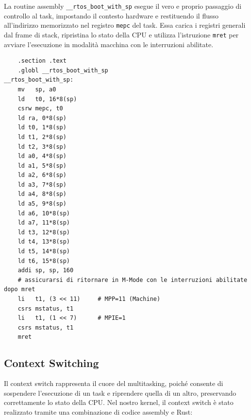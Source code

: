 \documentclass[italian, Lau, oneside]{sapthesis} %
\begin{document}
La routine assembly \texttt{\_\_rtos\_boot\_with\_sp} esegue il vero e proprio passaggio di controllo al task, impostando il contesto hardware e restituendo il flusso all’indirizzo memorizzato nel registro \texttt{mepc} del task.  
Essa carica i registri generali dal frame di stack, ripristina lo stato della CPU e utilizza l’istruzione \texttt{mret} per avviare l’esecuzione in modalità macchina con le interruzioni abilitate.

\begin{center}
\begin{verbatim}
    .section .text
    .globl __rtos_boot_with_sp
__rtos_boot_with_sp:
    mv   sp, a0
    ld   t0, 16*8(sp)
    csrw mepc, t0
    ld ra, 0*8(sp)
    ld t0, 1*8(sp)
    ld t1, 2*8(sp)
    ld t2, 3*8(sp)
    ld a0, 4*8(sp)
    ld a1, 5*8(sp)
    ld a2, 6*8(sp)
    ld a3, 7*8(sp)
    ld a4, 8*8(sp)
    ld a5, 9*8(sp)
    ld a6, 10*8(sp)
    ld a7, 11*8(sp)
    ld t3, 12*8(sp)
    ld t4, 13*8(sp)
    ld t5, 14*8(sp)
    ld t6, 15*8(sp)
    addi sp, sp, 160
    # assicurarsi di ritornare in M-Mode con le interruzioni abilitate dopo mret
    li   t1, (3 << 11)     # MPP=11 (Machine)
    csrs mstatus, t1
    li   t1, (1 << 7)      # MPIE=1
    csrs mstatus, t1
    mret
\end{verbatim}
\end{center}



\subsection{Context Switching}
Il context switch rappresenta il cuore del multitasking, poiché consente di sospendere l’esecuzione di un task e riprendere quella di un altro, preservando correttamente lo stato della CPU.  
Nel nostro kernel, il context switch è stato realizzato tramite una combinazione di codice assembly e Rust:
\end{document}
